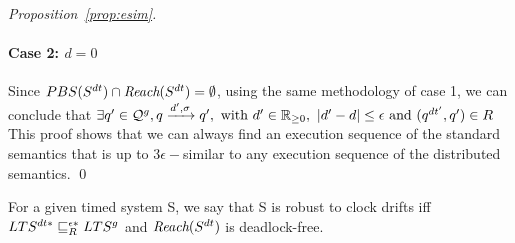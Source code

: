 \begin{proof}[Proposition~\ref{prop:esim}]
  \paragraph{\textbf{Case 2:} $d = 0$}
   Since $PBS(S^{dt})\cap\textit{Reach}(S^{dt})=\emptyset$, using the same methodology of case 1, we can conclude
   that $\exists q'\in\mathcal{Q}^g, q\xrightarrow{d',\sigma}q',\text{ with } 
        d'\in\mathbb{R}_{\ge 0}, \ |d'-d|\le\epsilon \text{ and } (q^{dt'},q')\in R$
  This proof shows that we can always find an execution sequence of the standard semantics that is up to
  $3\epsilon-$similar to any execution sequence of the distributed semantics. 
  \qed
\end{proof}
\begin{definition}[Robustness]
  For a given timed system S, we say that S is robust to clock drifts iff $LTS^{dt*}\sqsubseteq^{\epsilon*}_{R} LTS^g$
  and $\textit{Reach}(S^{dt})$ is deadlock-free.
\end{definition}

